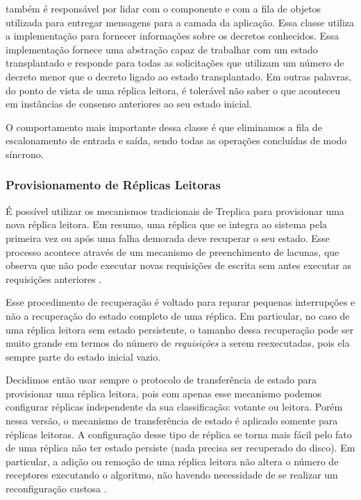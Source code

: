  também é responsável por lidar com o componente
 e com a fila de objetos utilizada para entregar mensagens para a camada
da aplicação. Essa classe utiliza a implementação  para
fornecer informações sobre os decretos conhecidos. Essa implementação fornece uma
abstração capaz de trabalhar com um estado transplantado e responde  para
todas as solicitações que utilizam um número de decreto menor que o decreto ligado ao
estado transplantado. Em outras palavras, do ponto de vista de uma réplica leitora, é
tolerável não saber o que aconteceu em instâncias de consenso anteriores ao seu estado
inicial.

O comportamento mais importante dessa classe é que eliminamos a fila de escalonamento de
entrada e saída, sendo todas as operações concluídas de modo síncrono.

\subsubsection{Provisionamento de Réplicas Leitoras}

É possível utilizar os mecanismos tradicionais de Treplica para provisionar uma nova
réplica leitora. Em resumo, uma réplica que se integra ao sistema pela primeira vez ou
após uma falha demorada deve recuperar o seu estado. Esse processo acontece através de um
mecanismo de preenchimento de lacunas, que observa que não pode executar novas requisições
de escrita sem antes executar as requisições anteriores \cite{vieira-tr10b}.

Esse procedimento de recuperação é voltado para reparar pequenas interrupções e não a
recuperação do estado completo de uma réplica. Em particular, no caso de uma réplica
leitora sem estado persistente, o tamanho dessa recuperação pode ser muito grande em
termos do número de \emph{requisições} a serem reexecutadas, pois ela sempre parte do
estado inicial vazio.

Decidimos então usar sempre o protocolo de transferência de estado para provisionar uma
réplica leitora, pois com apenas esse mecanismo podemos configurar réplicas independente
da sua classificação: votante ou leitora. Porém nessa versão, o mecanismo de transferência
de estado é aplicado somente para réplicas leitoras. A configuração desse tipo de réplica
se torna mais fácil pelo fato de uma réplica não ter estado persiste (nada precisa ser
recuperado do disco). Em particular, a adição ou remoção de uma réplica leitora não altera
o número de receptores executando o algoritmo, não havendo necessidade de se realizar um
reconfiguração custosa \cite{lamport10}.

